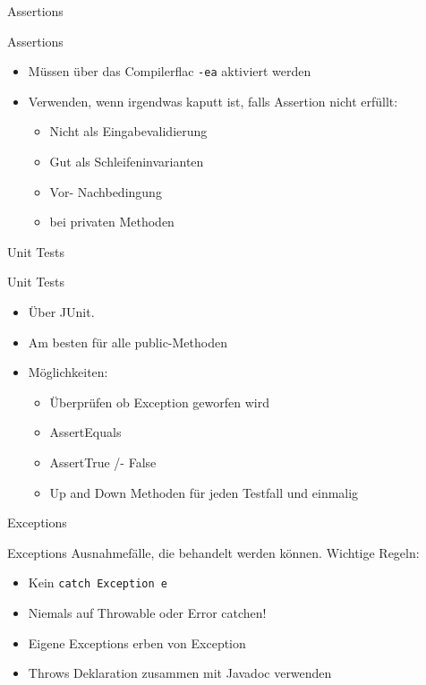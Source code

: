 \documentclass[18pt]{beamer}
\begin{document}
\begin{section}{Assertions} 
\begin{frame}[fragile]{Assertions}
 \pause
 \begin{itemize}
  \item Müssen über das Compilerflac \verb|-ea| aktiviert werden
  \item Verwenden, wenn irgendwas kaputt ist, falls Assertion nicht erfüllt:
  \begin{itemize}
   \item Nicht als Eingabevalidierung
   \item Gut als Schleifeninvarianten
   \item Vor- Nachbedingung
   \item bei privaten Methoden
  \end{itemize}
 \end{itemize}

\end{frame}
\end{section}


\begin{section}{Unit Tests} 

\begin{frame}{Unit Tests}
\pause
\begin{itemize}
 \item Über JUnit.
 \item Am besten für alle public-Methoden
 \item Möglichkeiten: \begin{itemize}
        \item Überprüfen ob Exception geworfen wird
        \item AssertEquals
        \item AssertTrue /- False
        \item Up and Down Methoden für jeden Testfall und einmalig
       \end{itemize}
\end{itemize}
\end{frame}
\end{section}


\begin{section}{Exceptions} 
\begin{frame}[fragile]{Exceptions}
Ausnahmefälle, die behandelt werden können.
Wichtige Regeln:
\begin{itemize}
 \item Kein \verb|catch Exception e|
 \item Niemals auf Throwable oder Error catchen!
 \item Eigene Exceptions erben von Exception
 \item Throws Deklaration zusammen mit Javadoc verwenden
\end{itemize}

\end{frame}
\end{section}
\end{document}

